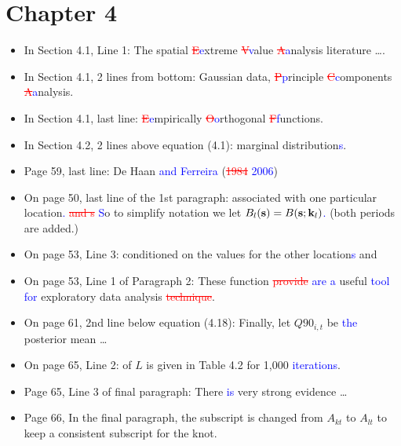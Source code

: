 \documentclass[11pt]{article}
\begin{document}
\section*{Chapter 4}
\begin{itemize}
  \item In Section 4.1, Line 1: The spatial \textcolor{red}{\st{E}}\textcolor{blue}{e}xtreme \textcolor{red}{\st{V}}\textcolor{blue}{v}alue \textcolor{red}{\st{A}}\textcolor{blue}{a}nalysis literature \ldots.
  \item In Section 4.1, 2 lines from bottom: Gaussian data, \textcolor{red}{\st{P}}\textcolor{blue}{p}rinciple \textcolor{red}{\st{C}}\textcolor{blue}{c}omponents \textcolor{red}{\st{A}}\textcolor{blue}{a}nalysis.
  \item In Section 4.1, last line: \textcolor{red}{\st{E}}\textcolor{blue}{e}mpirically \textcolor{red}{\st{O}}\textcolor{blue}{o}rthogonal \textcolor{red}{\st{F}}\textcolor{blue}{f}unctions.
  \item In Section 4.2, 2 lines above equation (4.1): marginal distribution\textcolor{blue}{s}.
  \item Page 59, last line: De Haan \textcolor{blue}{and Ferreira} (\textcolor{red}{\st{1984}} \textcolor{blue}{2006})
  \item On page 50, last line of the 1st paragraph: associated with one particular location\textcolor{blue}{.} \textcolor{red}{\st{and s}} \textcolor{blue}{S}o to simplify notation we let $B_l(\mathbf{s}) = B(\mathbf{s}; \mathbf{k}_l)$\textcolor{blue}{.} (both periods are added.)
  \item On page 53, Line 3: conditioned on the values for the other location\textcolor{blue}{s} and
  \item On page 53, Line 1 of Paragraph 2: These function \textcolor{red}{\st{provide}} \textcolor{blue}{are a} useful \textcolor{blue}{tool for} exploratory data analysis \textcolor{red}{\st{technique}}.
  \item On page 61, 2nd line below equation (4.18): Finally, let $Q90_{i, t}$ be \textcolor{blue}{the} posterior mean \ldots
  \item On page 65, Line 2: of $L$ is given in Table 4.2 for 1,000 \textcolor{blue}{iterations}.
  \item Page 65, Line 3 of final paragraph: There \textcolor{blue}{is} very strong evidence \ldots
  \item Page 66, In the final paragraph, the subscript is changed from $A_{kt}$ to $A_{lt}$ to keep a consistent subscript for the knot.
\end{itemize}
\end{document}
